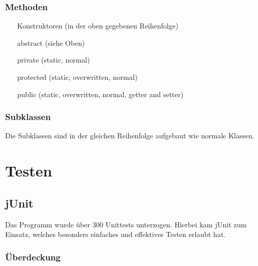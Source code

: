 \documentclass[parskip=full]{scrreprt}
\begin{document}
\subsection{Methoden}
\begin{enumerate}
	\item[Konstruktoren] (in der oben gegebenen Reihenfolge)
	\item[abstract] (siehe Oben)
	\item[private] (static, normal)
	\item[protected] (static, overwritten, normal)
	\item[public] (static, overwritten, normal, getter and setter)
\end{enumerate}
\subsection{Subklassen}
Die Subklassen sind in der gleichen Reihenfolge aufgebaut wie normale Klassen.

\chapter{Testen}

\section{jUnit}

Das Programm wurde über 300 Unittests unterzogen. Hierbei kam jUnit zum Einsatz, welches besonders einfaches und effektives Testen erlaubt hat.

\subsection{Überdeckung}
\end{document}

